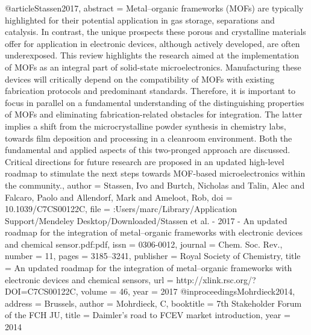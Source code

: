 @article{Stassen2017,
abstract = {Metal–organic frameworks (MOFs) are typically highlighted for their potential application in gas storage, separations and catalysis. In contrast, the unique prospects these porous and crystalline materials offer for application in electronic devices, although actively developed, are often underexposed. This review highlights the research aimed at the implementation of MOFs as an integral part of solid-state microelectronics. Manufacturing these devices will critically depend on the compatibility of MOFs with existing fabrication protocols and predominant standards. Therefore, it is important to focus in parallel on a fundamental understanding of the distinguishing properties of MOFs and eliminating fabrication-related obstacles for integration. The latter implies a shift from the microcrystalline powder synthesis in chemistry labs, towards film deposition and processing in a cleanroom environment. Both the fundamental and applied aspects of this two-pronged approach are discussed. Critical directions for future research are proposed in an updated high-level roadmap to stimulate the next steps towards MOF-based microelectronics within the community.},
author = {Stassen, Ivo and Burtch, Nicholas and Talin, Alec and Falcaro, Paolo and Allendorf, Mark and Ameloot, Rob},
doi = {10.1039/C7CS00122C},
file = {:Users/marc/Library/Application Support/Mendeley Desktop/Downloaded/Stassen et al. - 2017 - An updated roadmap for the integration of metal–organic frameworks with electronic devices and chemical sensor.pdf:pdf},
issn = {0306-0012},
journal = {Chem. Soc. Rev.},
number = {11},
pages = {3185--3241},
publisher = {Royal Society of Chemistry},
title = {{An updated roadmap for the integration of metal–organic frameworks with electronic devices and chemical sensors}},
url = {http://xlink.rsc.org/?DOI=C7CS00122C},
volume = {46},
year = {2017}
}
@inproceedings{Mohrdieck2014,
address = {Brussels},
author = {Mohrdieck, C},
booktitle = {7th Stakeholder Forum of the FCH JU},
title = {{Daimler's road to FCEV market introduction}},
year = {2014}
}

